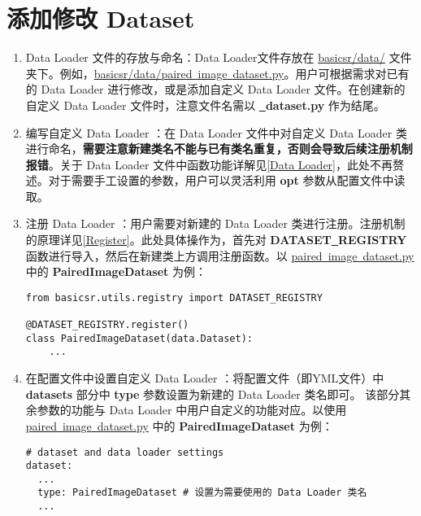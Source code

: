 \documentclass[../main.tex]{subfiles}
\begin{document}
\section{添加修改 Dataset}
\begin{enumerate}
    \item Data Loader 文件的存放与命名：Data Loader文件存放在 \href{https://github.com/XPixelGroup/BasicSR/tree/master/basicsr/data}{basicsr/data/} 文件夹下。例如，\href{https://github.com/XPixelGroup/BasicSR/tree/master/basicsr/data}{basicsr/data/paired\underline{~}image\underline{~}dataset.py}。用户可根据需求对已有的 Data Loader 进行修改，或是添加自定义 Data Loader 文件。在创建新的自定义 Data Loader 文件时，注意文件名需以  \textbf{\underline{~}dataset.py} 作为结尾。

    \item 编写自定义 Data Loader ：在 Data Loader 文件中对自定义 Data Loader 类进行命名，\textbf{需要注意新建类名不能与已有类名重复，否则会导致后续注册机制报错}。关于 Data Loader 文件中函数功能详解见\ref{Data Loader}，此处不再赘述。对于需要手工设置的参数，用户可以灵活利用 \textbf{opt} 参数从配置文件中读取。

    \item 注册 Data Loader ：用户需要对新建的 Data Loader 类进行注册。注册机制的原理详见\ref{Register}。此处具体操作为，首先对 \textbf{DATASET\underline{~}REGISTRY} 函数进行导入，然后在新建类上方调用注册函数。以 \href{https://github.com/XPixelGroup/BasicSR/tree/master/basicsr/data/paired_image_dataset.py}{paired\underline{~}image\underline{~}dataset.py} 中的 \textbf{PairedImageDataset} 为例：
          \begin{verbatim}
from basicsr.utils.registry import DATASET_REGISTRY

@DATASET_REGISTRY.register()
class PairedImageDataset(data.Dataset):
    ...
\end{verbatim}

    \item 在配置文件中设置自定义 Data Loader ：将配置文件（即YML文件）中 \textbf{datasets} 部分中 \textbf{type} 参数设置为新建的 Data Loader 类名即可。
          该部分其余参数的功能与 Data Loader 中用户自定义的功能对应。以使用 \href{https://github.com/XPixelGroup/BasicSR/tree/master/basicsr/data/paired_image_dataset.py}{paired\underline{~}image\underline{~}dataset.py} 中的 \textbf{PairedImageDataset} 为例：
          \begin{verbatim}
# dataset and data loader settings
dataset:
  ...
  type: PairedImageDataset # 设置为需要使用的 Data Loader 类名
  ...
\end{verbatim}
\end{enumerate}
\end{document}
